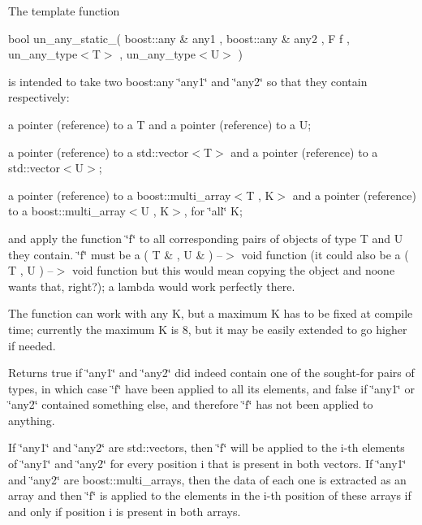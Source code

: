 The template function

bool un\+\_\+any\+\_\+static\+\_( boost\+::any \& any1 , boost\+::any \& any2 , F f , un\+\_\+any\+\_\+type$<$\+T$>$ , un\+\_\+any\+\_\+type$<$\+U$>$ )

is intended to take two boost\+:any \char`\"{}any1\char`\"{} and \char`\"{}any2\char`\"{} so that they contain respectively\+:


\begin{DoxyItemize}
\item a pointer (reference) to a T and a pointer (reference) to a U;
\item a pointer (reference) to a std\+::vector$<$\+T$>$ and a pointer (reference) to a std\+::vector$<$\+U$>$;
\item a pointer (reference) to a boost\+::multi\+\_\+array$<$\+T , K$>$ and a pointer (reference) to a boost\+::multi\+\_\+array$<$\+U , K$>$, for \char`\"{}all\char`\"{} K;
\end{DoxyItemize}

and apply the function \char`\"{}f\char`\"{} to all corresponding pairs of objects of type T and U they contain. \char`\"{}f\char`\"{} must be a ( T \& , U \& ) --$>$ void function (it could also be a ( T , U ) --$>$ void function but this would mean copying the object and noone wants that, right?); a lambda would work perfectly there.

The function can work with any K, but a maximum K has to be fixed at compile time; currently the maximum K is 8, but it may be easily extended to go higher if needed.

Returns true if \char`\"{}any1\char`\"{} and \char`\"{}any2\char`\"{} did indeed contain one of the sought-\/for pairs of types, in which case \char`\"{}f\char`\"{} have been applied to all its elements, and false if \char`\"{}any1\char`\"{} or \char`\"{}any2\char`\"{} contained something else, and therefore \char`\"{}f\char`\"{} has not been applied to anything.

If \char`\"{}any1\char`\"{} and \char`\"{}any2\char`\"{} are std\+::vectors, then \char`\"{}f\char`\"{} will be applied to the i-\/th elements of \char`\"{}any1\char`\"{} and \char`\"{}any2\char`\"{} for every position i that is present in both vectors. If \char`\"{}any1\char`\"{} and \char`\"{}any2\char`\"{} are boost\+::multi\+\_\+arrays, then the data of each one is extracted as an array and then \char`\"{}f\char`\"{} is applied to the elements in the i-\/th position of these arrays if and only if position i is present in both arrays.

